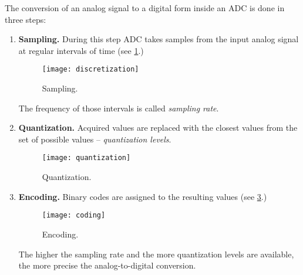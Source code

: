 \documentclass[../sparc.tex]{subfiles}
\begin{document}

The conversion of an analog signal to a digital form inside an ADC is done in
three steps:

\begin{enumerate}

\item \textbf{Sampling.}  During this step ADC takes samples from the input
  analog signal at regular intervals of time (see \ref{fig:discretization}.)

  \begin{figure}[h]
    \centering
    \texttt{[image: discretization]}
    \caption{Sampling.}
    \label{fig:discretization}
  \end{figure}

  The frequency of those intervals is called \emph{sampling rate}.

\item \textbf{Quantization.}  Acquired values are replaced with the closest
  values from the set of possible values -- \emph{quantization levels}.

  \begin{figure}[h]
    \texttt{[image: quantization]}
    \caption{Quantization.}
    \label{fig:quantization}
    \centering
  \end{figure}

\item \textbf{Encoding.}  Binary codes are assigned to the resulting values (see
  \ref{fig:coding}.)

  \begin{figure}[h]
    \texttt{[image: coding]}
    \caption{Encoding.}
    \label{fig:coding}
    \centering
  \end{figure}

  The higher the sampling rate and the more quantization levels are available,
  the more precise the analog-to-digital conversion.

\end{enumerate}
\end{document}
